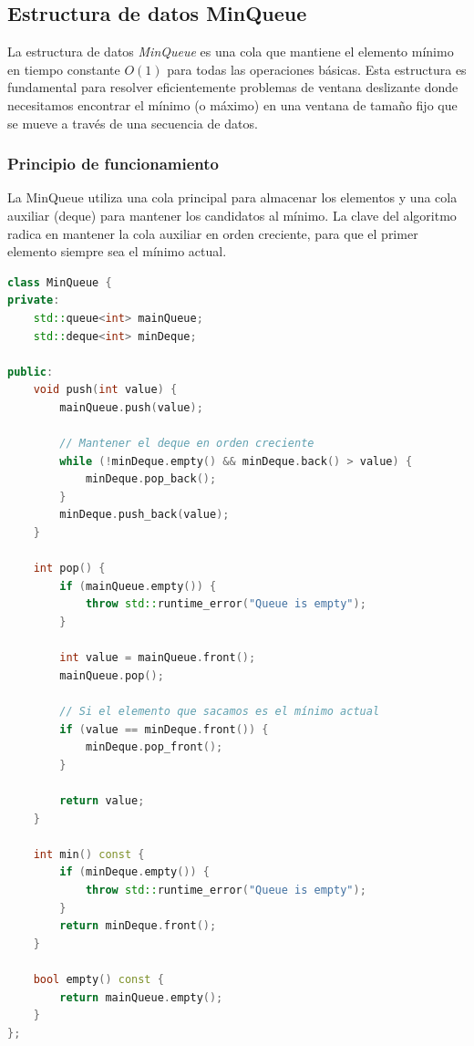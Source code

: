 \documentclass[12pt,a4paper]{article}
\begin{document}
\subsection{Estructura de datos MinQueue}

La estructura de datos \textit{MinQueue} es una cola que mantiene el elemento mínimo en tiempo constante $O(1)$ para todas las operaciones básicas. Esta estructura es fundamental para resolver eficientemente problemas de ventana deslizante donde necesitamos encontrar el mínimo (o máximo) en una ventana de tamaño fijo que se mueve a través de una secuencia de datos.

\subsubsection{Principio de funcionamiento}

La MinQueue utiliza una cola principal para almacenar los elementos y una cola auxiliar (deque) para mantener los candidatos al mínimo. La clave del algoritmo radica en mantener la cola auxiliar en orden creciente, para que el primer elemento siempre sea el mínimo actual.

\begin{lstlisting}[language=C++, label=lst:minqueue_simple, caption={MaxMinQueue.hpp - Implementación básica de MinQueue con complejidad O(1) amortizado}]
class MinQueue {
private:
    std::queue<int> mainQueue;
    std::deque<int> minDeque;

public:
    void push(int value) {
        mainQueue.push(value);
        
        // Mantener el deque en orden creciente
        while (!minDeque.empty() && minDeque.back() > value) {
            minDeque.pop_back();
        }
        minDeque.push_back(value);
    }
    
    int pop() {
        if (mainQueue.empty()) {
            throw std::runtime_error("Queue is empty");
        }
        
        int value = mainQueue.front();
        mainQueue.pop();
        
        // Si el elemento que sacamos es el mínimo actual
        if (value == minDeque.front()) {
            minDeque.pop_front();
        }
        
        return value;
    }
    
    int min() const {
        if (minDeque.empty()) {
            throw std::runtime_error("Queue is empty");
        }
        return minDeque.front();
    }
    
    bool empty() const {
        return mainQueue.empty();
    }
};
\end{lstlisting}
\end{document}
